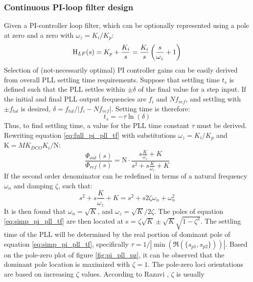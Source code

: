 		\subsubsection{Continuous PI-loop filter design}\label{cont_pi_filt_des}
			Given a PI-controller loop filter, which can be optionally represented using a pole at zero and a zero with $\omega_z = K_i/K_p$:
			\begin{equation} \label{eq:pi_pll_tf}
				\textnormal{H}_{LF}(s) = K_p + \frac{K_i}{s}  = \frac{K_i}{s}\left(\frac{s}{\omega_z} + 1\right) 
			\end{equation}
			Selection of (not-necessarily optimal) PI controller gains can be easily derived from overall PLL settling time requirements. Suppose that settling time $t_s$ is defined such that the PLL settles within $\pm \delta$ of the final value for a step input. If the initial and final PLL output frequencies are $f_i$ and $Nf_{ref}$, and settling with $\pm f_{tol}$ is desired,  $\delta = f_{tol}/|f_i - Nf_{ref}|$. Setting time is therefore:
			\begin{equation}
				t_s = -\tau\ln(\delta)
			\end{equation}
			Thus, to find settling time, a value for the PLL time constant $\tau$ must be derived. Rewriting equation \ref{eq:full_pi_pll_tf} with substitutions $\omega_z = K_i/K_p$ and $\mathrm{K} = MK_{DCO}K_i/\mathrm{N}$:
			\begin{equation} \label{eq:simp_pi_pll_tf}
				\frac{\Phi_{out}(s)}{\Phi_{ref}(s)} = \mathrm{N}\cdot\frac{s\frac{K}{\omega_z} + K }{s^2 + s\frac{K}{\omega_z} + K}
			\end{equation}
			If the second order denominator can be redefined in terms of a natural frequency $\omega_n$ and damping $\zeta$, such that:
			\begin{equation}
				s^2 + s\frac{K}{\omega_z} + K = s^2 + s2\zeta\omega_n + \omega_n^2
			\end{equation}
			It is then found that $\omega_n = \sqrt{K}$, and $\omega_z = \sqrt{K}/2\zeta$. The poles of equation \ref{eq:simp_pi_pll_tf} are then located at s = $\zeta\sqrt{K} \pm \sqrt{K}\sqrt{1-\zeta^2}$.
			The settling time of the PLL will be determined by the real portion of dominant pole of equation \ref{eq:simp_pi_pll_tf}, specifically $\tau = 1/|\min(\Re(\{s_{p1}, s_{p2}\}))|$. Based on the pole-zero plot of figure \ref{fig:pi_pll_pz}, it can be observed that the dominant pole location is maximized with $\zeta=1$. The pole-zero loci orientations are based on increasing $\zeta$ values. According to Razavi \cite{razavi_2017}, $\zeta$ is usually 
